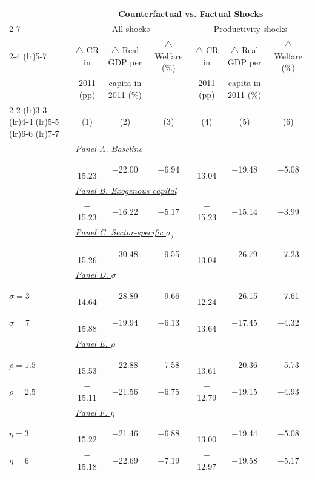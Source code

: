\begin{tabular}{l ccc ccc }
\toprule
& \multicolumn{6}{c}{Counterfactual vs. Factual Shocks} \\
\cmidrule(lr){2-7}
& \multicolumn{3}{c}{All shocks} & \multicolumn{3}{c}{Productivity shocks}\\
\cmidrule(lr){2-4} \cmidrule(lr){5-7}
& $\triangle$ CR in & $\triangle$ Real GDP per & $\triangle$ Welfare (\%) & $\triangle$ CR in & $\triangle$ Real GDP per & $\triangle$ Welfare (\%) \\
& 2011 (pp) & capita in 2011 (\%) & & 2011 (pp) & capita in 2011 (\%) & \\
\cmidrule(lr){2-2} \cmidrule(lr){3-3} \cmidrule(lr){4-4} \cmidrule(lr){5-5} \cmidrule(lr){6-6} \cmidrule(lr){7-7}
& (1) & (2) & (3) & (4) & (5) & (6) \\
\midrule
& \multicolumn{6}{l}{\underline{\textit{Panel A. Baseline}}} \\
 & $-$15.23 & $-$22.00 & $-$6.94 & $-$13.04 & $-$19.48 & $-$5.08 \\
[1em]
& \multicolumn{6}{l}{\underline{\textit{Panel B. Exogenous capital}}} \\
 & $-$15.23 & $-$16.22 & $-$5.17 & $-$15.23 & $-$15.14 & $-$3.99 \\
[1em]
& \multicolumn{6}{l}{\underline{\textit{Panel C. Sector-specific $\sigma_j$ \citep{Broda_Weinstein:06}}}} \\
 & $-$15.26 & $-$30.48 & $-$9.55 & $-$13.04 & $-$26.79 & $-$7.23 \\
[1em]
& \multicolumn{6}{l}{\underline{\textit{Panel D. $\sigma$}}} \\
$\sigma = 3$ & $-$14.64 & $-$28.89 & $-$9.66 & $-$12.24 & $-$26.15 & $-$7.61 \\
$\sigma = 7$ & $-$15.88 & $-$19.94 & $-$6.13 & $-$13.64 & $-$17.45 & $-$4.32 \\
[1em]
& \multicolumn{6}{l}{\underline{\textit{Panel E. $\rho$}}} \\
$\rho = 1.5$ & $-$15.53 & $-$22.88 & $-$7.58 & $-$13.61 & $-$20.36 & $-$5.73 \\
$\rho = 2.5$ & $-$15.11 & $-$21.56 & $-$6.75 & $-$12.79 & $-$19.15 & $-$4.93 \\
[1em]
& \multicolumn{6}{l}{\underline{\textit{Panel F. $\eta$}}} \\
$\eta = 3$ & $-$15.22 & $-$21.46 & $-$6.88 & $-$13.00 & $-$19.44 & $-$5.08 \\
$\eta = 6$ & $-$15.18 & $-$22.69 & $-$7.19 & $-$12.97 & $-$19.58 & $-$5.17 \\

\end{tabular}
